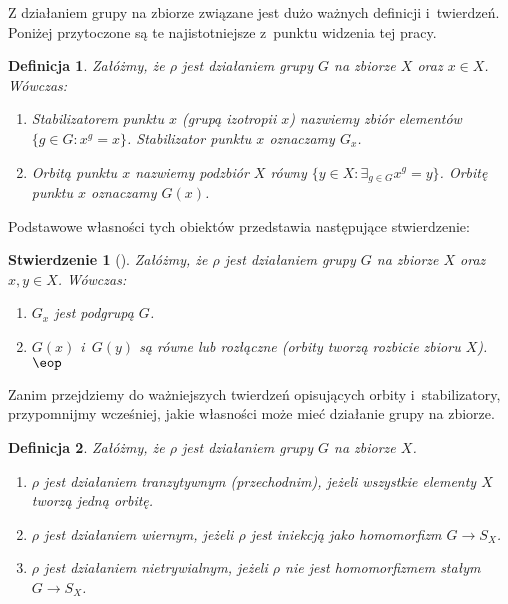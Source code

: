 \documentclass[licencjacka]{pracamgr}
\newtheorem{deff}{Definicja}[section]
\newtheorem{fact}{Stwierdzenie}[section]
\begin{document}
Z działaniem grupy na zbiorze związane jest dużo ważnych definicji
i~twierdzeń. Poniżej przytoczone są te najistotniejsze z~punktu
widzenia tej pracy.

\begin{deff}
    Załóżmy, że $\rho$ jest działaniem grupy $G$ na zbiorze $X$ oraz $x \in X$. Wówczas:
    \begin{enumerate}[label=\alph*)]
     \item \emph{Stabilizatorem punktu $x$ (grupą izotropii $x$)} nazwiemy zbiór elementów $\{g \in G\colon x^g = x \}$.
                    Stabilizator punktu $x$ oznaczamy $G_x$.
     \item \emph{Orbitą punktu $x$} nazwiemy podzbiór $X$ równy $\{y \in X \colon \exists_{g \in G} x^g = y \}$.
                    Orbitę punktu $x$ oznaczamy $G(x)$.
    \end{enumerate}
\end{deff}

Podstawowe własności tych obiektów przedstawia następujące stwierdzenie:
\begin{fact} [{\cite[tw. II.1.3.a,b)]{BB}}]
    Załóżmy, że $\rho$ jest działaniem grupy $G$ na zbiorze $X$ oraz $x, y \in X$. Wówczas:
    \begin{enumerate}[label=\alph*)]
     \item $G_x$ jest podgrupą $G$.
     \item $G(x)$ i~$G(y)$ są równe lub rozłączne (orbity tworzą rozbicie zbioru $X$).\quad$\eop$
    \end{enumerate}
\end{fact}

Zanim przejdziemy do ważniejszych twierdzeń opisujących orbity
i~stabilizatory, przypomnijmy wcześniej, jakie własności może mieć
działanie grupy na zbiorze.

\begin{deff}
    Załóżmy, że $\rho$ jest działaniem grupy $G$ na zbiorze $X$.
    \begin{enumerate}[label=\alph*)]
     \item \emph{$\rho$ jest działaniem tranzytywnym (przechodnim)}, jeżeli wszystkie elementy $X$ tworzą jedną orbitę.
     \item \emph{$\rho$ jest działaniem wiernym}, jeżeli $\rho$ jest iniekcją jako homomorfizm $G \to S_X$.
     \item \emph{$\rho$ jest działaniem nietrywialnym}, jeżeli $\rho$ nie jest homomorfizmem stałym $G \to S_X$.
    \end{enumerate}
\end{deff}
\end{document}
